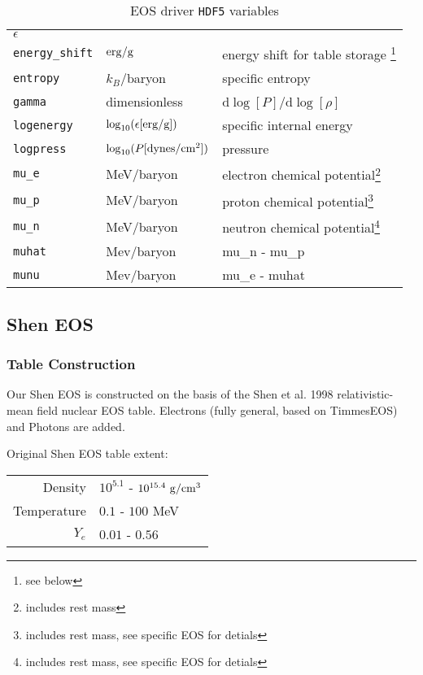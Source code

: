 \documentclass[10pt,nofootinbib]{article}
\newcommand{\code}[1]{\texttt{#1}}
\newenvironment{xaroundtbl}{\begin{flushleft}
  \renewcommand{\footnoterule}{}
  \begin{minipage}{\linewidth}
  \begin{center}}%
 {\end{center}\end{minipage}\end{flushleft}}
\begin{document}
\begin{table}[ht]
\begin{xaroundtbl}
\begin{tabular}{lll}
$\epsilon$\\[0.2mm]
\code{energy\_shift} & $\rm{erg}/\rm{g}$ & energy shift for table storage
\footnote{see below}\\[0.2mm]
\code{entropy} & $k_B$/baryon & specific entropy\\[0.2mm]
\code{gamma} & dimensionless & d$\log{[P]}$/d$\log{[\rho]}$\\[0.2mm]
\code{logenergy} & $\log_{10}(\epsilon [\rm{erg}/\rm{g}])$ & specific internal
energy\\[0.2mm]
\code{logpress} & $\log_{10}(P [\rm{dynes}/\rm{cm}^2])$ & pressure\\[0.2mm]
\code{mu\_e} & MeV/baryon & electron chemical
potential\footnote{includes rest mass}\\[0.2mm]
\code{mu\_p} & MeV/baryon & proton chemical potential\footnote{includes rest mass, see specific EOS for detials}\\[0.2mm]
\code{mu\_n} & MeV/baryon & neutron chemical potential\footnote{includes rest mass, see specific EOS for detials}\\[0.2mm]
\code{muhat} & Mev/baryon & mu\_n - mu\_p\\[0.2mm]
\code{munu} & Mev/baryon & mu\_e - muhat
\end{tabular}
\end{xaroundtbl}
\caption{EOS driver \code{HDF5} variables}\label{tab:eosvariables}
\end{table} 



\subsection{Shen EOS}

\subsubsection{Table Construction}                

Our Shen EOS is constructed on the basis of the Shen et al. 1998
relativistic-mean field nuclear EOS table. Electrons (fully general,
based on TimmesEOS) and Photons are added.
\newline

Original Shen EOS table extent:
\begin{table}[ht]
\begin{tabular}{r|l}
Density & $10^{5.1}$ - $10^{15.4}\ \rm{g}/\rm{cm}^3$ \\[0.2mm]
Temperature & $0.1$ - $100$ MeV \\[0.2mm]
$Y_e$ & $0.01$ - $0.56$
\end{tabular}
\end{table}
\end{document}
